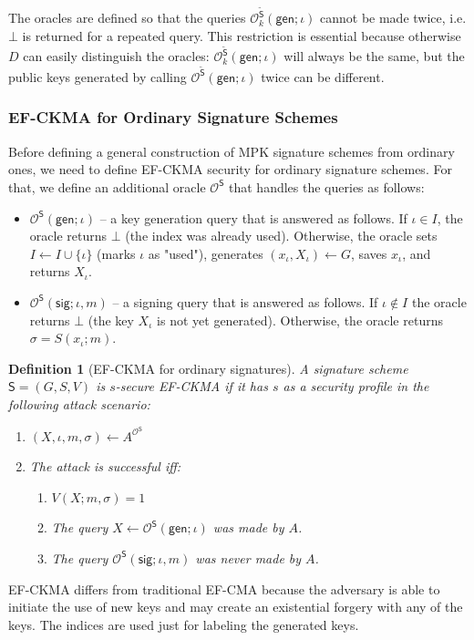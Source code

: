 \documentclass{article}
\newtheorem{definition}{Definition}[section]
\begin{document}
The oracles are defined so that the queries
$\mathcal{O}^{\tilde{\mathsf{S}}}_k(\mathsf{gen};\iota)$ cannot be made twice, i.e. $\bot$ is returned for a repeated query. This restriction is essential because otherwise $D$ can easily distinguish the oracles: $\mathcal{O}^{\tilde{\mathsf{S}}}_k(\mathsf{gen};\iota)$ will always be the same, but the public keys generated by calling $\mathcal{O}^{\tilde{\mathsf{S}}}(\mathsf{gen};\iota)$ twice can be different.

\subsubsection{EF-CKMA for Ordinary Signature Schemes}\label{sec:efckma-ordinary}
Before defining a general construction of MPK signature schemes from ordinary ones, we need to define EF-CKMA security for ordinary signature schemes. For that, we define an additional oracle $\mathcal{O}^{\mathsf{S}}$ that handles the
queries as follows:
\begin{itemize}
\item $\mathcal{O}^{\mathsf{S}}(\mathsf{gen};\iota)$ -- a key generation query that is answered as follows. If $\iota\in I$, the  oracle returns $\bot$ (the index was already used). Otherwise, the oracle sets $I\gets I\cup \{\iota\}$ (marks $\iota$ as "used"), generates $(x_\iota,X_\iota)\gets G$, saves $x_\iota$, and returns $X_\iota$.
\item $\mathcal{O}^{\mathsf{S}}(\mathsf{sig};\iota,m)$ -- a signing query that is answered as follows. If $\iota\not\in I$ the oracle returns $\bot$ (the key $X_\iota$ is not yet generated). Otherwise, the oracle returns $\sigma=S(x_\iota;m)$.
\end{itemize}



\begin{definition}[EF-CKMA for ordinary signatures]\label{def:efckma-ordinary}
A signature scheme $\mathsf{S}=(G,S,V)$ is $s$-secure EF-CKMA if it has $s$ as a security profile in the following attack scenario:
\begin{enumerate}
\item $(X,\iota,m,\sigma)\gets A^{\mathcal{O}^{\mathsf{S}}}$
\item The attack is successful iff:
\begin{enumerate}
\item $V(X;m,\sigma)=1$
\item The query $X\gets \mathcal{O}^{\mathsf{S}}(\mathsf{gen};\iota)$ was made by $A$.
\item The query $\mathcal{O}^{\mathsf{S}}(\mathsf{sig};\iota,m)$ was never made by $A$.
\end{enumerate}
\end{enumerate}
\end{definition}
EF-CKMA differs from traditional EF-CMA because the adversary is able to initiate the use of new keys and may create an existential forgery with any of the keys. The indices are used just for labeling the generated keys.
\end{document}
